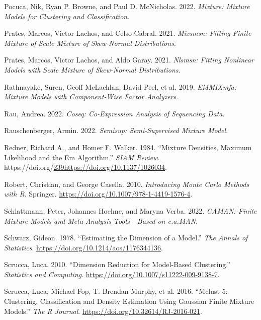 \begin{CSLReferences}{1}{0}
\leavevmode{}%
Pocuca, Nik, Ryan P. Browne, and Paul D. McNicholas. 2022. \emph{Mixture: Mixture Models for Clustering and Classification}.

\leavevmode{}%
Prates, Marcos, Victor Lachos, and Celso Cabral. 2021. \emph{Mixsmsn: Fitting Finite Mixture of Scale Mixture of Skew-Normal Distributions}.

\leavevmode{}%
Prates, Marcos, Victor Lachos, and Aldo Garay. 2021. \emph{Nlsmsn: Fitting Nonlinear Models with Scale Mixture of Skew-Normal Distributions}.

\leavevmode{}%
Rathnayake, Suren, Geoff McLachlan, David Peel, et al. 2019. \emph{EMMIXmfa: Mixture Models with Component-Wise Factor Analyzers}.

\leavevmode{}%
Rau, Andrea. 2022. \emph{Coseq: Co-Expression Analysis of Sequencing Data}.

\leavevmode{}%
Rauschenberger, Armin. 2022. \emph{Semisup: Semi-Supervised Mixture Model}.

\leavevmode{}%
Redner, Richard A., and Homer F. Walker. 1984. {``Mixture {Densities}, {Maximum Likelihood} and the {Em Algorithm}.''} \emph{SIAM Review}. https://doi.org/\url{239https://doi.org/10.1137/1026034}.

\leavevmode{}%
Robert, Christian, and George Casella. 2010. \emph{Introducing {Monte Carlo Methods} with {R}}. Springer. \url{https://doi.org/10.1007/978-1-4419-1576-4}.

\leavevmode{}%
Schlattmann, Peter, Johannes Hoehne, and Maryna Verba. 2022. \emph{CAMAN: Finite Mixture Models and Meta-Analysis Tools - Based on c.a.MAN}.

\leavevmode{}%
Schwarz, Gideon. 1978. {``Estimating the {Dimension} of a {Model}.''} \emph{The Annals of Statistics}. \url{https://doi.org/10.1214/aos/1176344136}.

\leavevmode{}%
Scrucca, Luca. 2010. {``Dimension Reduction for Model-Based Clustering.''} \emph{Statistics and Computing}. \url{https://doi.org/10.1007/s11222-009-9138-7}.

\leavevmode{}%
Scrucca, Luca, Michael Fop, T. Brendan Murphy, et al. 2016. {``Mclust 5: {Clustering}, {Classification} and {Density Estimation Using Gaussian Finite Mixture Models}.''} \emph{The R Journal}. \url{https://doi.org/10.32614/RJ-2016-021}.


\end{CSLReferences}
